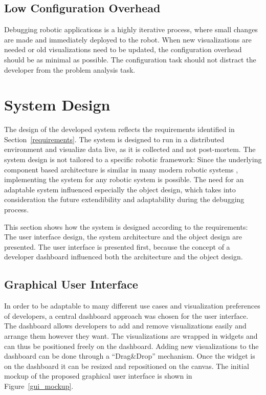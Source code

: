 \subsection{Low Configuration Overhead}
Debugging robotic applications is a highly iterative process, where small changes are made and immediately deployed to the robot. When new visualizations are needed or old visualizations need to be updated, the configuration overhead should be as minimal as possible. The configuration task should not distract the developer from the problem analysis task.

\section{System Design}
\label{system_design_section}
The design of the developed system reflects the requirements identified in Section~\ref{requirements}. The system is designed to run in a distributed environment and visualize data live, as it is collected and not post-mortem. The system design is not tailored to a specific robotic framework: Since the underlying component based architecture is similar in many modern robotic systems \cite{Quigley2009, Gerkey2003, Makarenko2006, Montemerlo2003}, implementing the system for any robotic system is possible.
The need for an adaptable system influenced especially the object design, which takes into consideration the future extendibility and adaptability during the debugging process.

This section shows how the system is designed according to the requirements: The user interface design, the system architecture and the object design are presented. The user interface is presented first, because the concept of a developer dashboard influenced both the architecture and the object design.

\subsection{Graphical User Interface}
\label{graphical_user_interface}
In order to be adaptable to many different use cases and visualization preferences of developers, a central dashboard approach was chosen for the user interface. The dashboard allows developers to add and remove visualizations easily and arrange them however they want. The visualizations are wrapped in widgets and can thus be positioned freely on the dashboard. Adding new visualizations to the dashboard can be done through a ``Drag\&Drop'' mechanism. Once the widget is on the dashboard it can be resized and repositioned on the canvas. The initial mockup of the proposed graphical user interface is shown in Figure~\ref{gui_mockup}.

